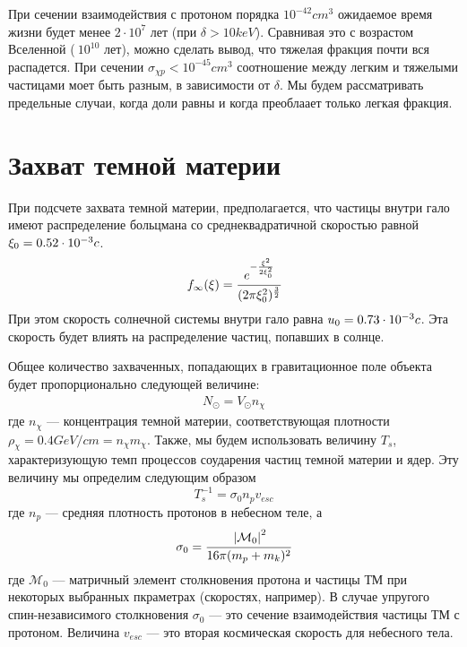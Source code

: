 При сечении взаимодействия с протоном порядка $10^{-42} cm^3$ ожидаемое время жизни будет менее $2 \cdot 10^7$ лет (при $\delta > 10 keV$). Сравнивая это с возрастом Вселенной ($~10^10$ лет), можно сделать вывод, что тяжелая фракция почти вся распадется. При сечении $\sigma_{\chi p} < 10^{-45} cm^3$ соотношение между легким и тяжелыми частицами моет быть разным, в зависимости от $\delta$. Мы будем рассматривать предельные случаи, когда доли равны и когда преоблаает только легкая фракция.


\section{Захват темной материи}

При подсчете захвата темной материи, предполагается, что частицы внутри гало имеют распределение больцмана со среднеквадратичной скоростью равной $\xi_0 = {0.52}\cdot 10^{-3} c$. 
\begin{equation}
	\label{dens_infty_xi}
	f_{\infty}(\xi)  = 
	\cfrac{e^{-\frac{\xi^2}{2\xi_0^2}}}{(2\pi\xi_0^2)^{\frac{3}{2}}}
\end{equation}
При этом скорость солнечной системы внутри гало равна $u_0 = {0.73}\cdot 10^{-3} c$. Эта скорость будет влиять на распределение частиц, попавших в солнце. 

Общее количество захваченных, попадающих в гравитационное поле объекта будет пропорционально следующей величине:
\begin{eqnarray}
	\label{eq:N_solar}
	N_{\odot} = V_{\odot} n_{\chi}
\end{eqnarray}
где $n_{\chi}$ --- концентрация темной материи, соответствующая плотности $\rho_{\chi} = 0.4 GeV/cm = n_{\chi} m_{\chi}$.
Также, мы будем использовать величину $T_s$, характеризующую темп процессов соударения частиц темной материи и ядер. Эту величину мы определим следующим образом
\begin{equation}
	\label{eq:T_s}
	T_s^{-1} = \sigma_{0} n_p v_{esc}
\end{equation}
где $n_p$ --- средняя плотность протонов в небесном теле, а 
\begin{equation}
	\label{sigma_0}
	\sigma_0 = \cfrac{\left| \mathcal{M}_0 \right|^{2}}{16\pi (m_p+m_k)^2}
\end{equation}
где $\mathcal{M}_0$ --- матричный элемент столкновения протона и частицы ТМ при некоторых выбранных пкраметрах (скоростях, например). В случае упругого спин-независимого столкновения $\sigma_0$ --- это сечение взаимодействия частицы ТМ с протоном.
Величина $v_{esc}$ --- это вторая космическая скорость для небесного тела.

